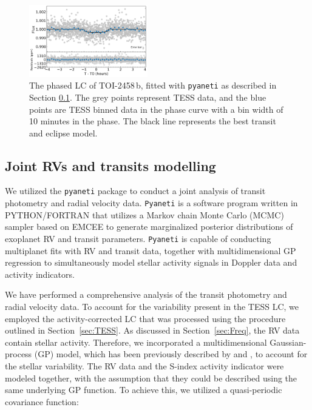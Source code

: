 \documentclass[traditabstract,longauth]{aa}
\begin{document}
\begin{figure}
\centering
\includegraphics[width=0.46\textwidth, trim= {0.0cm 0.0cm 0.0cm 0.0cm}]{figures/TOI2458b_tr.png}
\caption{The phased LC of TOI-2458\,b, fitted with {\tt pyaneti} as described in Section \ref{sec:RVs}. The grey points represent TESS data, and the blue points are TESS binned data in the phase curve with a bin width of 10 minutes in the phase. The black line represents the best transit and eclipse model.} \label{fig:transit}
\end{figure}

\subsection{Joint RVs and transits modelling}\label{sec:RVs}

We utilized the {\tt pyaneti} package \citep{pyaneti,Barragan22} to conduct a joint analysis of transit photometry and radial velocity data. {\tt Pyaneti} is a software program written in PYTHON/FORTRAN that utilizes a Markov chain Monte Carlo (MCMC) sampler based on EMCEE \citep{Foreman13} to generate marginalized posterior distributions of exoplanet RV and transit parameters. {\tt Pyaneti} is capable of conducting multiplanet fits with RV and transit data, together with multidimensional GP regression to simultaneously model stellar activity signals in Doppler data and activity indicators.

We have performed a comprehensive analysis of the transit photometry and radial velocity data. To account for the variability present in the TESS LC, we employed the activity-corrected LC that was processed using the procedure outlined in Section~\ref{sec:TESS}. As discussed in Section~\ref{sec:Freq}, the RV data contain stellar activity. Therefore, we incorporated a multidimensional Gaussian-process (GP) model, which has been previously described by \citet{Georgieva21} and \citet{Barragan22}, to account for the stellar variability. The RV data and the S-index activity indicator were modeled together, with the assumption that they could be described using the same underlying GP function. To achieve this, we utilized a quasi-periodic covariance function:
\end{document}

